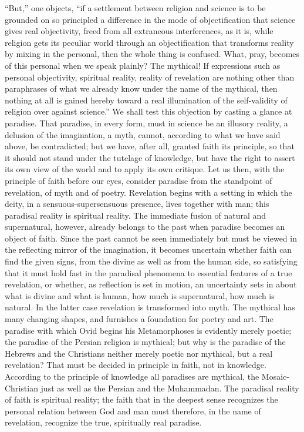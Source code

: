 \documentclass[12pt,a4paper]{article}
\newcommand{\opage}[1]{\marginnote{\footnotesize\textit{[#1]}}}
\begin{document}
``But,'' one objects, ``if a settlement between religion and science is
to be grounded on so principled a difference in the mode of
objectification that science gives real objectivity, freed from all
extraneous interferences, as it is, while religion gets its peculiar world
through an objectification that transforms reality by mixing in the
personal, then the whole thing is confused. What, pray, becomes of this
personal when we speak plainly? The mythical! If expressions such as
personal objectivity, spiritual reality, reality of revelation are
nothing other than paraphrases of what we already know under the name of
the mythical, then nothing at all is gained hereby toward a real
illumination of the self-validity of religion over against science.'' We
shall test this objection by casting a glance at paradise. That
paradise, in every form, must in science be an illusory reality, a
delusion of the imagination, a myth, cannot, according to what we have
said above, be contradicted; but we have, after all, granted faith its
principle, so that it should not stand under the tutelage of knowledge,
but have the right to assert its own view of the world and to apply its
own critique. Let us then, with the principle of faith before our eyes,
consider paradise from the standpoint of revelation, of myth and of
poetry. Revelation begins with a setting in which the deity, in a
sensuous-supersensuous presence, lives together with man; this paradisal
reality is spiritual reality. The immediate fusion of natural and
supernatural, however, already belongs to the past when paradise becomes
an object of
\opage{51}faith. Since the past cannot be seen immediately but must be viewed in
the reflecting mirror of the imagination, it becomes uncertain whether
faith can find the given signs, from the divine as well as from the
human side, so satisfying that it must hold fast in the paradisal
phenomena to essential features of a true revelation, or whether, as
reflection is set in motion, an uncertainty sets in about what is divine
and what is human, how much is supernatural, how much is natural. In the
latter case revelation is transformed into myth. The mythical has many
changing shapes, and furnishes a foundation for poetry and art. The
paradise with which Ovid begins his Metamorphoses is evidently merely
poetic; the paradise of the Persian religion is mythical; but why is the
paradise of the Hebrews and the Christians neither merely poetic nor
mythical, but a real revelation? That must be decided in principle in
faith, not in knowledge. According to the principle of knowledge all
paradises are mythical, the Mosaic-Christian just as well as the Persian
and the Muhammadan. The paradisal reality of faith is spiritual reality;
the faith that in the deepest sense recognizes the personal relation
between God and man must therefore, in the name of revelation, recognize
the true, spiritually real paradise.
\end{document}
